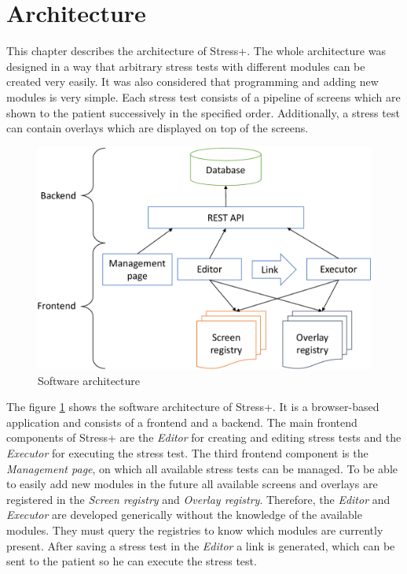 \section{Architecture}
\label{sec:architecture}

This chapter describes the architecture of Stress+.
The whole architecture was designed in a way that arbitrary stress tests with different modules can be created very easily.
It was also considered that programming and adding new modules is very simple.
Each stress test consists of a pipeline of screens which are shown to the patient successively in the specified order.
Additionally, a stress test can contain overlays which are displayed on top of the screens.

\begin{figure}[htb]
  \centering
  \includegraphics[width=\textwidth]{figures/Architecture-crop}
  \caption{Software architecture}
  \label{fig:software-architecture}
\end{figure}

The figure \ref{fig:software-architecture} shows the software architecture of Stress+.
It is a browser-based application and consists of a frontend and a backend.
The main frontend components of Stress+ are the \textit{Editor} for creating and editing stress tests and the \textit{Executor} for executing the stress test.
The third frontend component is the \textit{Management page}, on which all available stress tests can be managed.
To be able to easily add new modules in the future all available screens and overlays are registered in the \textit{Screen registry} and \textit{Overlay registry}. 
Therefore, the \textit{Editor} and \textit{Executor} are developed generically without the knowledge of the available modules.
They must query the registries to know which modules are currently present.
After saving a stress test in the \textit{Editor} a link is generated, which can be sent to the patient so he can execute the stress test.

